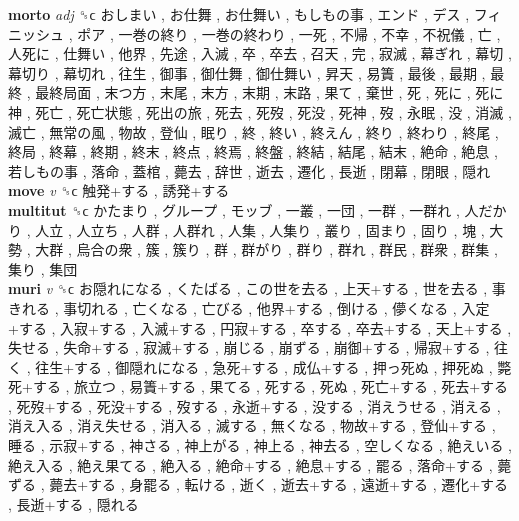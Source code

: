 \textbf{morto} \emph{adj}  ␝ϲ   おしまい ,  お仕舞 ,  お仕舞い ,  もしもの事 ,  エンド ,  デス ,  フィニッシュ ,  ポア ,  一巻の終り ,  一巻の終わり ,  一死 ,  不帰 ,  不幸 ,  不祝儀 ,  亡 ,  人死に ,  仕舞い ,  他界 ,  先途 ,  入滅 ,  卒 ,  卒去 ,  召天 ,  完 ,  寂滅 ,  幕ぎれ ,  幕切 ,  幕切り ,  幕切れ ,  往生 ,  御事 ,  御仕舞 ,  御仕舞い ,  昇天 ,  易簀 ,  最後 ,  最期 ,  最終 ,  最終局面 ,  末つ方 ,  末尾 ,  末方 ,  末期 ,  末路 ,  果て ,  棄世 ,  死 ,  死に ,  死に神 ,  死亡 ,  死亡状態 ,  死出の旅 ,  死去 ,  死歿 ,  死没 ,  死神 ,  歿 ,  永眠 ,  没 ,  消滅 ,  滅亡 ,  無常の風 ,  物故 ,  登仙 ,  眠り ,  終 ,  終い ,  終えん ,  終り ,  終わり ,  終尾 ,  終局 ,  終幕 ,  終期 ,  終末 ,  終点 ,  終焉 ,  終盤 ,  終結 ,  結尾 ,  結末 ,  絶命 ,  絶息 ,  若しもの事 ,  落命 ,  蓋棺 ,  薨去 ,  辞世 ,  逝去 ,  遷化 ,  長逝 ,  閉幕 ,  閉眼 ,  隠れ   \\
\textbf{move} \emph{v}  ␝ϲ   触発+する ,  誘発+する   \\
\textbf{multitut} ␝ϲ   かたまり ,  グループ ,  モッブ ,  一叢 ,  一団 ,  一群 ,  一群れ ,  人だかり ,  人立 ,  人立ち ,  人群 ,  人群れ ,  人集 ,  人集り ,  叢り ,  固まり ,  固り ,  塊 ,  大勢 ,  大群 ,  烏合の衆 ,  簇 ,  簇り ,  群 ,  群がり ,  群り ,  群れ ,  群民 ,  群衆 ,  群集 ,  集り ,  集団   \\
\textbf{muri} \emph{v}  ␝ϲ   お隠れになる ,  くたばる ,  この世を去る ,  上天+する ,  世を去る ,  事きれる ,  事切れる ,  亡くなる ,  亡びる ,  他界+する ,  倒ける ,  儚くなる ,  入定+する ,  入寂+する ,  入滅+する ,  円寂+する ,  卒する ,  卒去+する ,  天上+する ,  失せる ,  失命+する ,  寂滅+する ,  崩じる ,  崩ずる ,  崩御+する ,  帰寂+する ,  往く ,  往生+する ,  御隠れになる ,  急死+する ,  成仏+する ,  押っ死ぬ ,  押死ぬ ,  斃死+する ,  旅立つ ,  易簀+する ,  果てる ,  死する ,  死ぬ ,  死亡+する ,  死去+する ,  死歿+する ,  死没+する ,  歿する ,  永逝+する ,  没する ,  消えうせる ,  消える ,  消え入る ,  消え失せる ,  消入る ,  滅する ,  無くなる ,  物故+する ,  登仙+する ,  睡る ,  示寂+する ,  神さる ,  神上がる ,  神上る ,  神去る ,  空しくなる ,  絶えいる ,  絶え入る ,  絶え果てる ,  絶入る ,  絶命+する ,  絶息+する ,  罷る ,  落命+する ,  薨ずる ,  薨去+する ,  身罷る ,  転ける ,  逝く ,  逝去+する ,  遠逝+する ,  遷化+する ,  長逝+する ,  隠れる   \\

